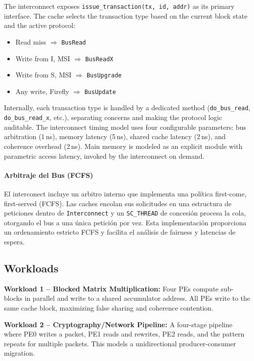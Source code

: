 \documentclass[journal,trans]{IEEEtran}
\begin{document}
The interconnect exposes \texttt{issue\_transaction(tx, id, addr)} as its
primary interface. The cache selects the transaction type based on the current
block state and the active protocol:
 
\begin{itemize}
  \item Read miss $\Rightarrow$ \texttt{BusRead}
  \item Write from I, MSI $\Rightarrow$ \texttt{BusReadX}
  \item Write from S, MSI $\Rightarrow$ \texttt{BusUpgrade}
  \item Any write, Firefly $\Rightarrow$ \texttt{BusUpdate}
\end{itemize}
 
Internally, each transaction type is handled by a dedicated method
(\texttt{do\_bus\_read}, \texttt{do\_bus\_read\_x}, etc.), separating concerns
and making the protocol logic auditable. The interconnect timing model uses four
configurable parameters: bus arbitration (1\,ns), memory latency (5\,ns),
shared cache latency (2\,ns), and coherence overhead (2\,ns).
Main memory is modeled as an explicit module with parametric access latency,
invoked by the interconnect on demand.

\paragraph{Arbitraje del Bus (FCFS)}
El interconect incluye un arbitro interno que implementa una política
first-come, first-served (FCFS). Las caches encolan sus solicitudes en una
estructura de peticiones dentro de \texttt{Interconnect} y un \texttt{SC\_THREAD} de
concesión procesa la cola, otorgando el bus a una única petición por vez.
Esta implementación proporciona un ordenamiento estricto FCFS y facilita el
análisis de fairness y latencias de espera.
 
\subsection{Workloads}
 
\textbf{Workload 1 -- Blocked Matrix Multiplication:}
Four PEs compute sub-blocks in parallel and write to a shared accumulator
address. All PEs write to the same cache block, maximizing false sharing and
coherence contention.
 
\textbf{Workload 2 -- Cryptography/Network Pipeline:}
A four-stage pipeline where PE0 writes a packet, PE1 reads and rewrites,
PE2 reads, and the pattern repeats for multiple packets. This models a
unidirectional producer-consumer migration.
 
\end{document}
